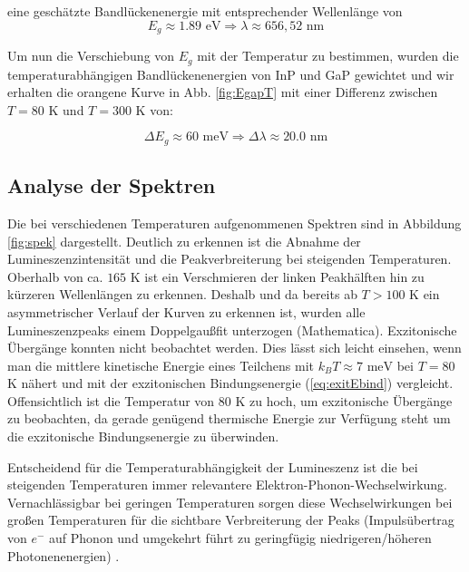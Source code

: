 \documentclass[aps,twocolumn,secnumarabic,nobalancelastpage,amsmath,amssymb,
nofootinbib,superscriptaddress]{revtex4-1}
\begin{document}
\noindent eine geschätzte Bandlückenenergie mit entsprechender Wellenlänge von
\begin{equation}
  E_g \approx 1.89\text{ eV} \Rightarrow  \lambda \approx 656,52\text{ nm}
  \label{eq:evEgap300K}
\end{equation}

\noindent Um nun die Verschiebung von $E_g$ mit der Temperatur zu bestimmen, wurden
die temperaturabhängigen Bandlückenenergien von InP und GaP gewichtet und wir erhalten
die orangene Kurve in Abb. \ref{fig:EgapT} mit einer Differenz zwischen $T=80\text{ K}$
und $T=300\text{ K}$ von:

\begin{equation}
  \Delta E_g \approx 60\text{ meV} \Rightarrow \Delta\lambda \approx 20.0\text{ nm}
\label{eq:evVersch}
\end{equation}

\subsection{Analyse der Spektren}

\noindent Die bei verschiedenen Temperaturen aufgenommenen Spektren sind in Abbildung \ref{fig:spek} dargestellt.
Deutlich zu erkennen ist die Abnahme der Lumineszenzintensität und die Peakverbreiterung bei steigenden Temperaturen.
Oberhalb von ca. $165\text{ K}$ ist ein Verschmieren der linken Peakhälften hin zu kürzeren Wellenlängen zu erkennen.
Deshalb und da bereits ab $T>100$ K ein asymmetrischer Verlauf der Kurven zu erkennen ist, wurden alle Lumineszenzpeaks
einem Doppelgaußfit unterzogen (Mathematica).
Exzitonische Übergänge konnten nicht beobachtet werden. Dies lässt sich leicht
einsehen, wenn man die mittlere kinetische Energie eines Teilchens mit $k_B T\approx 7\text{ meV}$ bei $T=80$ K nähert und
mit der exzitonischen Bindungsenergie (\ref{eq:exitEbind}) vergleicht. Offensichtlich ist die Temperatur
von 80 K zu hoch, um exzitonische Übergänge zu beobachten, da gerade genügend thermische Energie zur Verfügung steht
um die exzitonische Bindungsenergie zu überwinden.

Entscheidend für die Temperaturabhängigkeit der Lumineszenz ist die bei steigenden Temperaturen immer
relevantere Elektron-Phonon-Wechselwirkung. Vernachlässigbar bei geringen Temperaturen sorgen diese Wechselwirkungen
bei großen Temperaturen für die sichtbare Verbreiterung der Peaks (Impulsübertrag von $e^-$ auf Phonon und umgekehrt führt
zu geringfügig niedrigeren/höheren Photonenenergien) \cite{phonons}.
\end{document}
